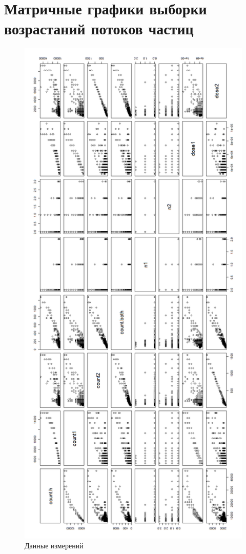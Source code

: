 
\chapter{Матричные графики выборки возрастаний потоков частиц} \label{AppendixG}%
\begin{figure}[h!]
	\centering
	\includegraphics[height=0.7\textheight]{images/Flash/Rplot06}
	\caption{Данные измерений}
	\label{fig:rplot06}
\end{figure}

